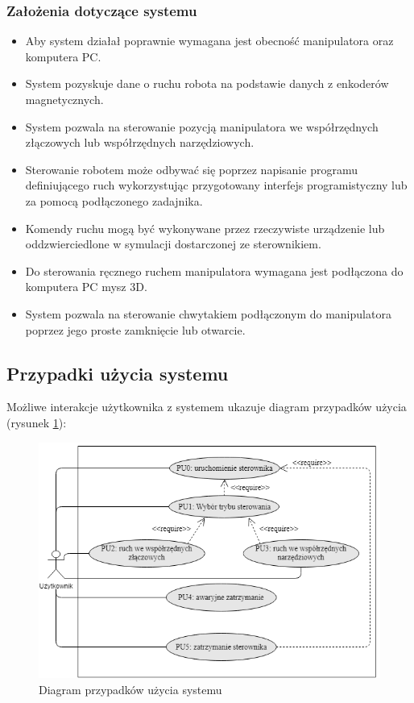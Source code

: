 \documentclass[a4paper, 12pt, twoside]{article}
\begin{document}
\subsubsection{Założenia dotyczące systemu}
\begin{itemize}
\item Aby system działał poprawnie wymagana jest obecność manipulatora oraz komputera PC.
\item System pozyskuje dane o ruchu robota na podstawie danych z enkoderów magnetycznych.
\item System pozwala na sterowanie pozycją manipulatora we współrzędnych złączowych lub współrzędnych narzędziowych.
\item Sterowanie robotem może odbywać się poprzez napisanie programu definiującego ruch wykorzystując przygotowany interfejs programistyczny lub za pomocą podłączonego zadajnika.
\item Komendy ruchu mogą być wykonywane przez rzeczywiste urządzenie lub oddzwierciedlone w symulacji dostarczonej ze sterownikiem.
\item Do sterowania ręcznego ruchem manipulatora wymagana jest podłączona do komputera PC mysz 3D.
\item System pozwala na sterowanie chwytakiem podłączonym do manipulatora poprzez jego proste zamknięcie lub otwarcie.
\end{itemize}

\subsection{Przypadki użycia systemu}
Możliwe interakcje użytkownika z systemem  ukazuje diagram przypadków użycia (rysunek \ref{fig:use_cases}):

\begin{figure}[hbt!]
\centering
\includegraphics[width=1.0\linewidth]{images/use_cases.png}
\caption{Diagram przypadków użycia systemu }
\label{fig:use_cases}
\end{figure}
\end{document}
